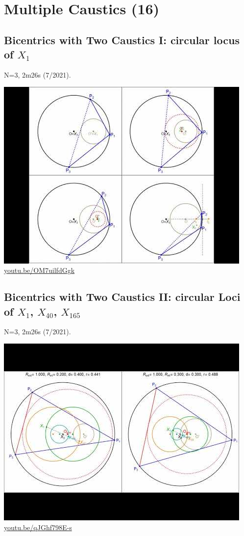 \documentclass[12pt]{amsart}
\begin{document}
\section{Multiple Caustics (16)}

\subsection{Bicentrics with Two Caustics I: circular locus of $X_{1}$}
\label{vid:OM7uilfdGgk}
\noindent N=3, 2m26s (7/2021). 
\begin{center}\includegraphics[width=.5\textwidth]{pics/OM7uilfdGgk.jpg} \\ 
\href{https://youtu.be/OM7uilfdGgk}{\url{youtu.be/OM7uilfdGgk}}\end{center}
% 
\subsection{Bicentrics with Two Caustics II: circular Loci of $X_{1}$, $X_{40}$, $X_{165}$}
\label{vid:qJGhf798E-s}
\noindent N=3, 2m26s (7/2021). 
\begin{center}\includegraphics[width=.5\textwidth]{pics/qJGhf798E-s.jpg} \\ 
\href{https://youtu.be/qJGhf798E-s}{\url{youtu.be/qJGhf798E-s}}\end{center}
% 
\end{document}
